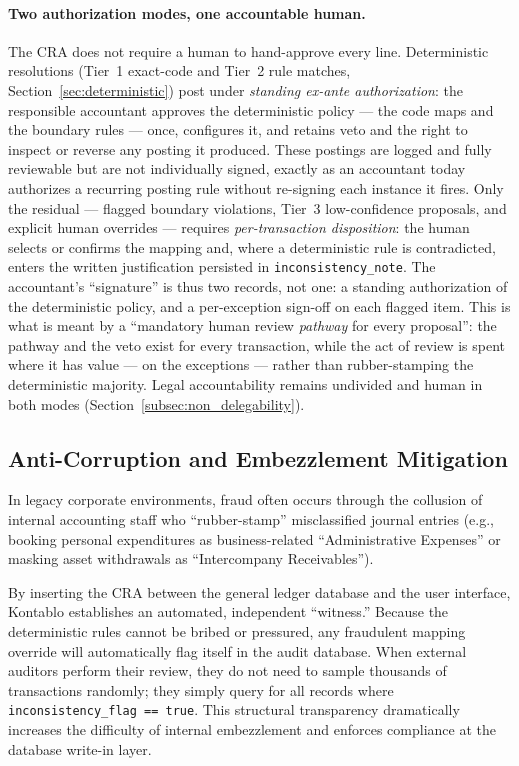 \paragraph{Two authorization modes, one accountable human.} The CRA does not
require a human to hand-approve every line. Deterministic resolutions (Tier~1
exact-code and Tier~2 rule matches, Section~\ref{sec:deterministic}) post under
\emph{standing ex-ante authorization}: the responsible accountant approves the
deterministic policy --- the code maps and the boundary rules --- once,
configures it, and retains veto and the right to inspect or reverse any posting
it produced. These postings are logged and fully reviewable but are not
individually signed, exactly as an accountant today authorizes a recurring
posting rule without re-signing each instance it fires. Only the residual ---
flagged boundary violations, Tier~3 low-confidence proposals, and explicit
human overrides --- requires \emph{per-transaction disposition}: the human
selects or confirms the mapping and, where a deterministic rule is
contradicted, enters the written justification persisted in
\texttt{inconsistency\_note}. The accountant's ``signature'' is thus two
records, not one: a standing authorization of the deterministic policy, and a
per-exception sign-off on each flagged item. This is what is meant by a
``mandatory human review \emph{pathway} for every proposal'': the pathway and
the veto exist for every transaction, while the act of review is spent where it
has value --- on the exceptions --- rather than rubber-stamping the
deterministic majority. Legal accountability remains undivided and human in
both modes (Section~\ref{subsec:non_delegability}).

\subsection{Anti-Corruption and Embezzlement Mitigation}
In legacy corporate environments, fraud often occurs through the collusion of internal accounting staff who ``rubber-stamp'' misclassified journal entries (e.g., booking personal expenditures as business-related ``Administrative Expenses'' or masking asset withdrawals as ``Intercompany Receivables''). 

By inserting the CRA between the general ledger database and the user interface, Kontablo establishes an automated, independent ``witness.'' Because the deterministic rules cannot be bribed or pressured, any fraudulent mapping override will automatically flag itself in the audit database. When external auditors perform their review, they do not need to sample thousands of transactions randomly; they simply query for all records where \texttt{inconsistency\_flag == true}. This structural transparency dramatically increases the difficulty of internal embezzlement and enforces compliance at the database write-in layer.

